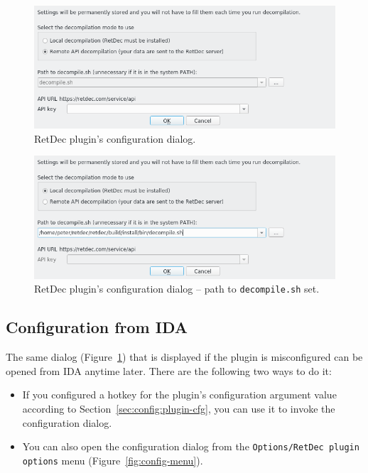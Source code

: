 \documentclass[pdftex, a4paper,12pt, oneside, svgnames]{article}
\begin{document}
\begin{figure}[!ht]
	\centering
	\includegraphics[width=13cm]{figures/config-1}
	\caption{RetDec plugin's configuration dialog.}
	\label{fig:config-dialog-1}
\end{figure}

\begin{figure}[!ht]
	\centering
	\includegraphics[width=13cm]{figures/config-2}
	\caption{RetDec plugin's configuration dialog -- path to \texttt{decompile.sh} set.}
	\label{fig:config-dialog-2}
\end{figure}

\subsection{Configuration from IDA}
\label{sec:config:from-ida}
The same dialog (Figure~\ref{fig:config-dialog-1}) that is displayed if the plugin is misconfigured can be opened from IDA anytime later. There are the following two ways to do it:
\begin{itemize}
	\item If you configured a hotkey for the plugin's configuration argument value according to Section~\ref{sec:config:plugin-cfg}, you can use it to invoke the configuration dialog.
	\item You can also open the configuration dialog from the \texttt{Options/RetDec plugin options} menu (Figure~\ref{fig:config-menu}).
\end{itemize}
\end{document}
